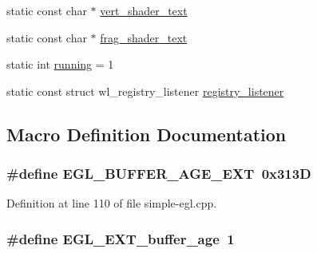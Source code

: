 \begin{DoxyCompactItemize}
\item 
static const char $\ast$ \hyperlink{simple-egl_8cpp_a717575939a37d84dcd4cf0447a630834}{vert\+\_\+shader\+\_\+text}
\item 
static const char $\ast$ \hyperlink{simple-egl_8cpp_ab5a6a2a26ac23f79b1687daa4b0d8980}{frag\+\_\+shader\+\_\+text}
\item 
static int \hyperlink{simple-egl_8cpp_a2f45113638a0b749a8a205d2cd7fb42b}{running} = 1
\item 
static const struct wl\+\_\+registry\+\_\+listener \hyperlink{simple-egl_8cpp_a8998c87c94cd7d185e8f0cdafab4b1c4}{registry\+\_\+listener}
\end{DoxyCompactItemize}


\subsection{Macro Definition Documentation}
\subsubsection[{\texorpdfstring{E\+G\+L\+\_\+\+B\+U\+F\+F\+E\+R\+\_\+\+A\+G\+E\+\_\+\+E\+XT}{EGL_BUFFER_AGE_EXT}}]{\setlength{\rightskip}{0pt plus 5cm}\#define E\+G\+L\+\_\+\+B\+U\+F\+F\+E\+R\+\_\+\+A\+G\+E\+\_\+\+E\+XT~0x313D}\hypertarget{simple-egl_8cpp_a7045d8a6b4857f268a62fab2de2021fd}{}\label{simple-egl_8cpp_a7045d8a6b4857f268a62fab2de2021fd}


Definition at line 110 of file simple-\/egl.\+cpp.

\subsubsection[{\texorpdfstring{E\+G\+L\+\_\+\+E\+X\+T\+\_\+buffer\+\_\+age}{EGL_EXT_buffer_age}}]{\setlength{\rightskip}{0pt plus 5cm}\#define E\+G\+L\+\_\+\+E\+X\+T\+\_\+buffer\+\_\+age~1}\hypertarget{simple-egl_8cpp_a0792e3d8b2bc978f95917a234b0c81df}{}\label{simple-egl_8cpp_a0792e3d8b2bc978f95917a234b0c81df}


